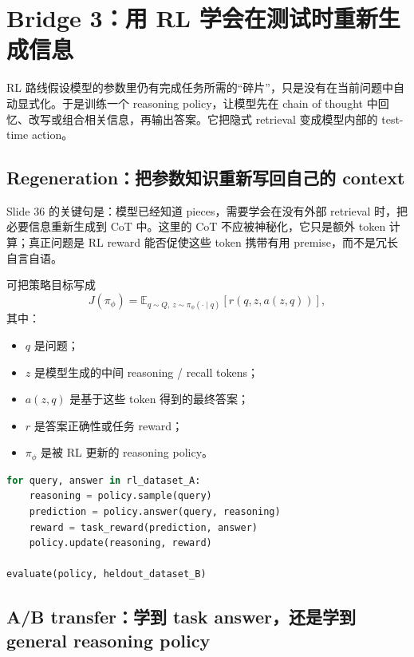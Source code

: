 \section{Bridge 3：用 RL 学会在测试时重新生成信息}

RL 路线假设模型的参数里仍有完成任务所需的“碎片”，只是没有在当前问题中自动显式化。于是训练一个 reasoning policy，让模型先在 chain of thought 中回忆、改写或组合相关信息，再输出答案。它把隐式 retrieval 变成模型内部的 test-time action。

\subsection{Regeneration：把参数知识重新写回自己的 context}

Slide 36 的关键句是：模型已经知道 pieces，需要学会在没有外部 retrieval 时，把必要信息重新生成到 CoT 中。这里的 CoT 不应被神秘化，它只是额外 token 计算；真正问题是 RL reward 能否促使这些 token 携带有用 premise，而不是冗长自言自语。


可把策略目标写成
$$
J(\pi_{\phi})=
\mathbb{E}_{q\sim Q,\,z\sim\pi_{\phi}(\cdot\mid q)}
\left[r\!\left(q,z,a(z,q)\right)\right],
$$
其中：
\begin{itemize}
  \item $q$ 是问题；
  \item $z$ 是模型生成的中间 reasoning / recall tokens；
  \item $a(z,q)$ 是基于这些 token 得到的最终答案；
  \item $r$ 是答案正确性或任务 reward；
  \item $\pi_{\phi}$ 是被 RL 更新的 reasoning policy。
\end{itemize}

\begin{lstlisting}[language=Python,caption={用 RL 学习 test-time regeneration 的抽象训练循环}]
for query, answer in rl_dataset_A:
    reasoning = policy.sample(query)
    prediction = policy.answer(query, reasoning)
    reward = task_reward(prediction, answer)
    policy.update(reasoning, reward)

evaluate(policy, heldout_dataset_B)
\end{lstlisting}

\subsection{A/B transfer：学到 task answer，还是学到 general reasoning policy}

